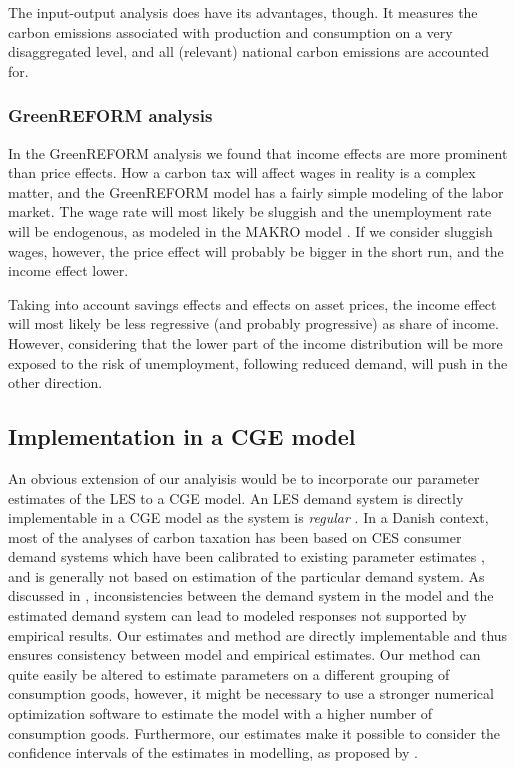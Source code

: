 The input-output analysis does have its advantages, though. It measures the carbon emissions associated with production and consumption on a very disaggregated level, and all (relevant) national carbon emissions are accounted for.

\subsubsection{GreenREFORM analysis}
In the GreenREFORM analysis we found that income effects are more prominent than price effects. How a carbon tax will affect wages in reality is a complex matter, and the GreenREFORM model has a fairly simple modeling of the labor market. The wage rate will most likely be sluggish and the unemployment rate will be endogenous, as modeled in the MAKRO model \citep{MAKRO_mini}. If we consider sluggish wages, however, the price effect will probably be bigger in the short run, and the income effect lower.

Taking into account savings effects and effects on asset prices, the income effect will most likely be less regressive (and probably progressive) as share of income. However, considering that the lower part of the income distribution will be more exposed to the risk of unemployment, following reduced demand, will push in the other direction.

\subsection{Implementation in a CGE model}
An obvious extension of our analyisis would be to incorporate our parameter estimates of the LES to a CGE model. An LES demand system is directly implementable in a CGE model as the system is \textit{regular} \citep{shojaeddiniconsumer}. In a Danish context, most of the analyses of carbon taxation has been based on CES consumer demand systems which have been calibrated to existing parameter estimates \citep{dmoer2009, dmoer2021, Kraka2020}, and is generally not based on estimation of the particular demand system. As discussed in \cite{shojaeddiniconsumer}, inconsistencies between the demand system in the model and the estimated demand system can lead to modeled responses not supported by empirical results. Our estimates and method are directly implementable and thus ensures consistency between model and empirical estimates. Our method can quite easily be altered to estimate parameters on a different grouping of consumption goods, however, it might be necessary to use a stronger numerical optimization software to estimate the model with a higher number of consumption goods. Furthermore, our estimates make it possible to consider the confidence intervals of the estimates in modelling, as proposed by \cite{hertel2007confident}.

